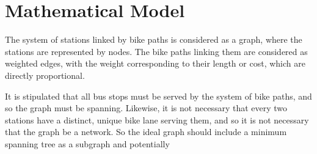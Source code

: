 \section{Mathematical Model} 

The system of stations linked by bike paths is considered as a graph, where the stations are represented by nodes.  The bike paths linking them are considered as weighted edges, with the weight corresponding to their length or cost, which are directly proportional.  

It is stipulated that all bus stops must be served by the system of bike paths, and so the graph must be spanning.  Likewise, it is not necessary that every two stations have a distinct, unique bike lane serving them, and so it is not necessary that the graph be a network.  So the ideal graph should include a minimum spanning tree as a subgraph and potentially 
